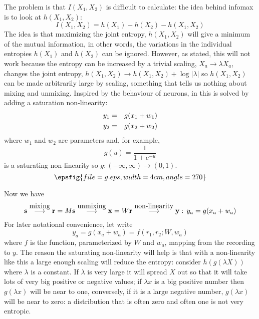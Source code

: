 \documentclass[12pt]{article}
\begin{document}
The problem is that $I(X_1,X_2)$ is difficult to calculate: the idea
behind infomax is to look at $h(X_1,X_2)$:
\begin{equation}
I(X_1,X_2)=h(X_1)+h(X_2)-h(X_1,X_2)
\end{equation}
The idea is that maximizing the joint entropy, $h(X_1,X_2)$ will give
a minimum of the mutual information, in other words, the variations in
the individual entropies $h(X_1)$ and $h(X_2)$ can be
ignored. However, as stated, this will not work because the entropy
can be increased by a trivial scaling, $X_a\rightarrow \lambda X_a$,
changes the joint entropy, $h(X_1,X_2)\rightarrow
h(X_1,X_2)+\log{|\lambda|}$ so $h(X_1,X_2)$ can be made arbitrarily
large by scaling, something that tells us nothing about mixing and
unmixing. Inspired by the behaviour of neurons, in
\cite{BellSejnowski1995} this is solved by adding a saturation
non-linearity:
\begin{eqnarray}
y_1&=&g(x_1+w_1)\cr
y_2&=&g(x_2+w_2)
\end{eqnarray}
where $w_1$ and $w_2$ are parameters and, for example,
\begin{equation}
g(u)=\frac{1}{1+e^{-u}}
\end{equation}
is a saturating non-linearity so $g:(-\infty,\infty)\rightarrow (0,1)$.
\begin{equation}
\epsfig{file=g.eps,width=4cm,angle=270}
\end{equation}

Now we have
\begin{equation}
{\bf s}\stackrel{\mbox{mixing}}{\longrightarrow}{\bf r}=M{\bf s}\stackrel{\mbox{unmixing}}{\longrightarrow}{\bf x}=W{\bf r}\stackrel{\mbox{non-linearity}}{\longrightarrow}{\bf y}:\,y_a=g(x_a+w_a)
\end{equation}
For later notational convenience, let write
\begin{equation}
y_a=g(x_a+w_a)=f(r_1,r_2;W,w_a)
\end{equation}
where $f$ is the function, parameterized by $W$ and $w_a$, mapping
from the recording to $y$. The reason the saturating non-linearity will
help is that with a non-linearity like this a large enough scaling
will reduce the entropy: consider $h(g(\lambda X))$ where $\lambda$ is
a constant. If $\lambda$ is very large it will spread $X$ out so that
it will take lots of very big positive or negative values; if $\lambda
x$ is a big positive number then $g(\lambda x)$ will be near to one,
conversely, if it is a large negative number, $g(\lambda x)$ will be
near to zero: a distribution that is often zero and often one is not
very entropic.
\end{document}
